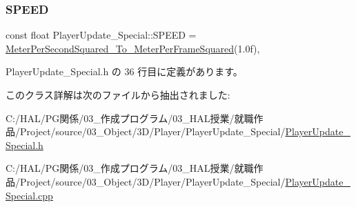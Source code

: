 \subsubsection{\texorpdfstring{S\+P\+E\+ED}{SPEED}}
{\footnotesize\ttfamily const float Player\+Update\+\_\+\+Special\+::\+S\+P\+E\+ED = \mbox{\hyperlink{_meter_to_frame_8h_a3a2c155748ceb2eab2a3c303ae48ecc0}{Meter\+Per\+Second\+Squared\+\_\+\+To\+\_\+\+Meter\+Per\+Frame\+Squared}}(1.\+0f)\hspace{0.3cm}{\ttfamily [static]}, {\ttfamily [private]}}



 Player\+Update\+\_\+\+Special.\+h の 36 行目に定義があります。



このクラス詳解は次のファイルから抽出されました\+:\begin{DoxyCompactItemize}
\item 
C\+:/\+H\+A\+L/\+P\+G関係/03\+\_\+作成プログラム/03\+\_\+\+H\+A\+L授業/就職作品/\+Project/source/03\+\_\+\+Object/3\+D/\+Player/\+Player\+Update\+\_\+\+Special/\mbox{\hyperlink{_player_update___special_8h}{Player\+Update\+\_\+\+Special.\+h}}\item 
C\+:/\+H\+A\+L/\+P\+G関係/03\+\_\+作成プログラム/03\+\_\+\+H\+A\+L授業/就職作品/\+Project/source/03\+\_\+\+Object/3\+D/\+Player/\+Player\+Update\+\_\+\+Special/\mbox{\hyperlink{_player_update___special_8cpp}{Player\+Update\+\_\+\+Special.\+cpp}}\end{DoxyCompactItemize}
